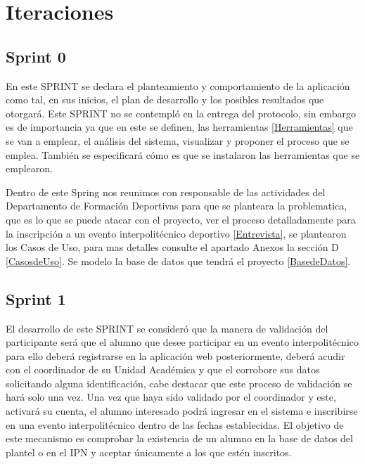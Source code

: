 	
	
	\section{Iteraciones}
	\subsection{Sprint 0}
	\noindent En este SPRINT se declara el planteamiento y comportamiento de la aplicación como tal, en sus inicios, el plan de desarrollo y los posibles resultados que otorgará.
	Este SPRINT no se contempló en la entrega del protocolo, sin embargo es de importancia ya que en este se definen, las herramientas \ref{Herramientas} que se van a emplear, el análisis del sistema, visualizar y proponer el proceso que se emplea.
	También se especificará cómo es que se instalaron las herramientas que se emplearon.
	
	\noindent Dentro de este Spring nos reunimos con responsable de las actividades del Departamento de Formación Deportivas para que se planteara la problematica, que es lo que se puede atacar con el proyecto, ver el proceso detalladamente para la inscripción a un evento interpolitécnico deportivo \ref{Entrevista}, se plantearon los Casos de Uso, para mas detalles consulte el apartado Anexos la sección D \ref{CasosdeUso}. Se modelo la base de datos que tendrá el proyecto \ref{BasedeDatos}. 
	\pagebreak
	
	\subsection{Sprint 1}
	\noindent El desarrollo de este SPRINT se consideró que la manera de validación del participante será que el alumno que desee participar en un evento interpolitécnico para ello deberá registrarse en la aplicación web posteriormente, deberá acudir con el coordinador de su Unidad Académica y que el corrobore sus datos solicitando alguna identificación, cabe destacar que este proceso de validación se hará solo una vez.
	Una vez que haya sido validado por el coordinador y este, activará su cuenta, el alumno interesado podrá ingresar en el sistema e inscribirse en una evento interpolitécnico dentro de las fechas establecidas.
	El objetivo de este mecanismo es comprobar la existencia de un alumno en la base de datos del plantel o en el IPN y aceptar únicamente a los que estén inscritos.
	
